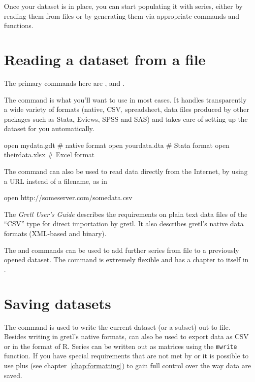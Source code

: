 Once your dataset is in place, you can start populating it with
series, either by reading them from files or by generating them via
appropriate commands and functions.

\section{Reading a dataset from a file}

The primary commands here are ,  and .

The  command is what you'll want to use in most cases. It
handles transparently a wide variety of formats (native, CSV,
spreadsheet, data files produced by other packages such as
\textsf{Stata}, \textsf{Eviews}, \textsf{SPSS} and \textsf{SAS}) and
takes care of setting up the dataset for you automatically.
\begin{code}
  open mydata.gdt      # native format
  open yourdata.dta    # Stata format
  open theirdata.xlsx  # Excel format
\end{code}

The  command can also be used to read data directly from the
Internet, by using a URL instead of a filename, as in
\begin{code}
  open http://someserver.com/somedata.csv
\end{code}

The \textit{Gretl User's Guide} describes the requirements on plain
text data files of the ``CSV'' type for direct importation by
gretl. It also describes gretl's native data formats (XML-based and
binary).

The  and  commands can be used to add further
series from file to a previously opened dataset. The 
command is extremely flexible and has a chapter to itself in
\GUG.

\section{Saving datasets}

The  command is used to write the current dataset (or a
subset) out to file. Besides writing in gretl's native formats,
 can also be used to export data as CSV or in the format of
\textsf{R}. Series can be written out as matrices using the
\texttt{mwrite} function. If you have special requirements that are
not met by  or  it is possible to use
 plus  (see chapter~\ref{chap:formatting})
to gain full control over the way data are saved.


